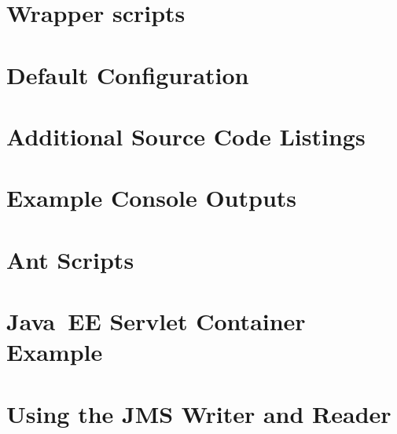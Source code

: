 % 


\appendix


\chapter{Wrapper scripts}\label{appendix:wrapperScripts}


\chapter{\KiekerMonitoringPart{} Default Configuration}\label{sec:appdx:monitoringproperties}


\chapter{Additional Source Code Listings}\label{appendix:additionalSourceCode}


\chapter{Example Console Outputs}\label{appendix:exampleConsoleOutputs}


\chapter{Ant Scripts}\label{appendix:antScripts}


\chapter{Java~EE Servlet Container Example}\label{appendix:JavaEEServletExample}


\chapter{Using the JMS Writer and Reader}\label{appendix:usingJMS}



